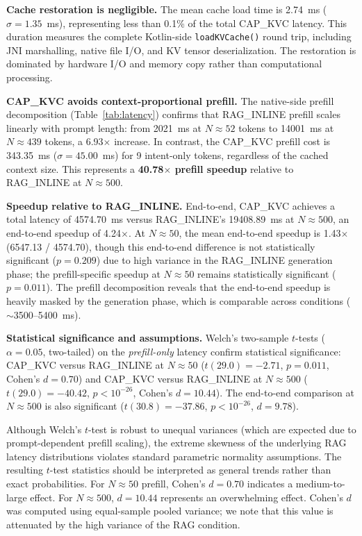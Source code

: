 \documentclass[journal]{IEEEtran}
\begin{document}
\textbf{Cache restoration is negligible.} The mean cache load time is 2.74~ms ($\sigma = 1.35$~ms), representing less than 0.1\% of the total CAP\_KVC latency. This duration measures the complete Kotlin-side \texttt{loadKVCache()} round trip, including JNI marshalling, native file I/O, and KV tensor deserialization. The restoration is dominated by hardware I/O and memory copy rather than computational processing.

\textbf{CAP\_KVC avoids context-proportional prefill.} The native-side prefill decomposition (Table~\ref{tab:latency}) confirms that RAG\_INLINE prefill scales linearly with prompt length: from 2021~ms at $N \approx 52$ tokens to 14001~ms at $N \approx 439$ tokens, a 6.93$\times$ increase. In contrast, the CAP\_KVC prefill cost is 343.35~ms ($\sigma = 45.00$~ms) for 9 intent-only tokens, regardless of the cached context size. This represents a \textbf{40.78$\times$ prefill speedup} relative to RAG\_INLINE at $N \approx 500$.

\textbf{Speedup relative to RAG\_INLINE.} End-to-end, CAP\_KVC achieves a total latency of 4574.70~ms versus RAG\_INLINE's 19408.89~ms at $N \approx 500$, an end-to-end speedup of 4.24$\times$. At $N \approx 50$, the mean end-to-end speedup is 1.43$\times$ (6547.13 / 4574.70), though this end-to-end difference is not statistically significant ($p = 0.209$) due to high variance in the RAG\_INLINE generation phase; the prefill-specific speedup at $N \approx 50$ remains statistically significant ($p = 0.011$). The prefill decomposition reveals that the end-to-end speedup is heavily masked by the generation phase, which is comparable across conditions ($\sim$3500--5400~ms).

\textbf{Statistical significance and assumptions.} Welch's two-sample $t$-tests ($\alpha = 0.05$, two-tailed) on the \emph{prefill-only} latency confirm statistical significance: CAP\_KVC versus RAG\_INLINE at $N \approx 50$ ($t(29.0) = -2.71$, $p = 0.011$, Cohen's $d = 0.70$) and CAP\_KVC versus RAG\_INLINE at $N \approx 500$ ($t(29.0) = -40.42$, $p < 10^{-26}$, Cohen's $d = 10.44$). The end-to-end comparison at $N \approx 500$ is also significant ($t(30.8) = -37.86$, $p < 10^{-26}$, $d = 9.78$). 

Although Welch's $t$-test is robust to unequal variances (which are expected due to prompt-dependent prefill scaling), the extreme skewness of the underlying RAG latency distributions violates standard parametric normality assumptions. The resulting $t$-test statistics should be interpreted as general trends rather than exact probabilities. For $N \approx 50$ prefill, Cohen's $d = 0.70$ indicates a medium-to-large effect. For $N \approx 500$, $d = 10.44$ represents an overwhelming effect. Cohen's $d$ was computed using equal-sample pooled variance; we note that this value is attenuated by the high variance of the RAG condition.
\end{document}
